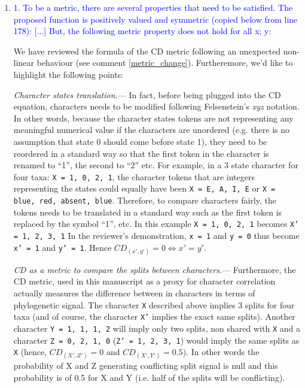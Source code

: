 \documentclass[12pt,letterpaper]{article}
\renewcommand{\subsubsection}[1]{%
\vspace{2ex}
\noindent
\textit{#1.}---}
\begin{document}
\begin{enumerate}

\item{\textcolor{blue}{1. To be a metric, there are several properties that need to be satisfied. The proposed function
is positively valued and symmetric (copied below from line 178): [...] But, the following metric property does not hold for all x; y:}}
\label{proof}

We have reviewed the formula of the CD metric following an unexpected non-linear behaviour (see comment \ref{metric_change}).
Furtheremore, we'd like to highlight the following points:


\subsubsection{Character states translation}
In fact, before being plugged into the CD equation, characters needs to be modified following Felsenstein's \textit{xyz} notation.
In other words, because the character states tokens are not representing any meaningful numerical value if the characters are unordered (e.g. there is no assumption that state 0 should come before state 1), they need to be reordered in a standard way so that the first token in the character is renamed to ``1'', the second to ``2'' etc.
For example, in a 3 state character for four taxa: \texttt{X = {1, 0, 2, 1}}, the character tokens that are integers representing the states could equally have been \texttt{X = {E, A, I, E}} or \texttt{X = {blue, red, absent, blue}}.
Therefore, to compare characters fairly, the tokens needs to be translated in a standard way such as the first token is replaced by the symbol ``1'', etc.
In this example \texttt{X = {1, 0, 2, 1}} becomes \texttt{X' = {1, 2, 3, 1}}
In the reviewer's demonstration, \texttt{x  = {1}} and \texttt{y  = {0}} thus become \texttt{x' = {1}} and \texttt{y' = {1}}.
Hence $CD_{(x',y')} = 0 \Leftrightarrow x' = y'$.

\subsubsection{CD as a metric to compare the splits between characters}
Furthermore, the CD metric, used in this manuscript as a proxy for character correlation actually measures the difference between in characters in terms of phylogenetic signal.
The character \texttt{X} described above implies 3 splits for four taxa (and of course, the character \texttt{X'} implies the exact same splits).
Another character \texttt{Y = {1, 1, 1, 2}} will imply only two splits, non shared with \texttt{X} and a character \texttt{Z = {0, 2, 1, 0}} (\texttt{Z' = {1, 2, 3, 1}}) would imply the same splits as \texttt{X} (hence, $CD_{(X',Z')} = 0$ and $CD_{(X',Y')} = 0.5$).
In other words the probability of X and Z generating conflicting split signal is null and this probability is of 0.5 for X and Y (i.e. half of the splits will be conflicting).


\end{enumerate}
\end{document}
